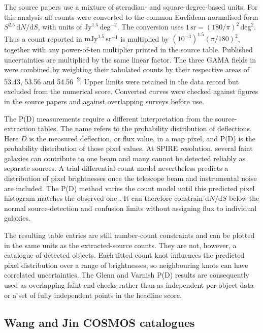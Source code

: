 \documentclass[12pt,a4paper]{article}
\begin{document}
The source papers use a mixture of steradian- and square-degree-based units. For this
analysis all counts were converted to the common Euclidean-normalised form
$S^{2.5}\,\mathrm{d}N/\mathrm{d}S$, with units of
$\mathrm{Jy}^{1.5}\,\mathrm{deg}^{-2}$. The conversion uses
$1\,\mathrm{sr}=(180/\pi)^2\,\mathrm{deg}^2$. Thus a count reported in
$\mathrm{mJy}^{1.5}\,\mathrm{sr}^{-1}$ is multiplied by
$(10^{-3})^{1.5}(\pi/180)^2$, together with any power-of-ten multiplier printed in the
source table. Published uncertainties are multiplied by the same linear factor. The
three GAMA fields in \citet{Valiante_2016} were combined by weighting their tabulated
counts by their respective areas of 53.43, 53.56 and
\SI{54.56}{\deg\squared}. Upper limits were retained in the data record but excluded
from the numerical score. Converted curves were checked against figures in the source
papers and against overlapping surveys before use.

The P(D) measurements require a different interpretation from the source-extraction
tables. The name refers to the probability distribution of deflections. Here $D$ is the
measured deflection, or flux value, in a map pixel, and P(D) is the probability
distribution of those pixel values. At SPIRE resolution, several faint
galaxies can contribute to one beam and many cannot be detected reliably as separate
sources. A trial differential-count model nevertheless predicts a distribution of pixel
brightnesses once the telescope beam and instrumental noise are included. The P(D)
method varies the count model until this predicted pixel histogram matches the observed
one \citep{Glenn_2010,Varnish_2025}. It can therefore constrain
$\mathrm{d}N/\mathrm{d}S$ below the normal source-detection and confusion limits without
assigning flux to individual galaxies.

The resulting table entries are still number-count constraints and can be plotted in
the same units as the extracted-source counts. They are not, however, a catalogue of
detected objects. Each fitted count knot influences the predicted pixel distribution
over a range of brightnesses, so neighbouring knots can have correlated uncertainties.
The Glenn and Varnish P(D) results are consequently used as overlapping faint-end
checks rather than as independent per-object data or a set of fully independent points
in the headline score.

\subsection{Wang and Jin COSMOS catalogues}
\label{sec:data:catalogues}
\end{document}
